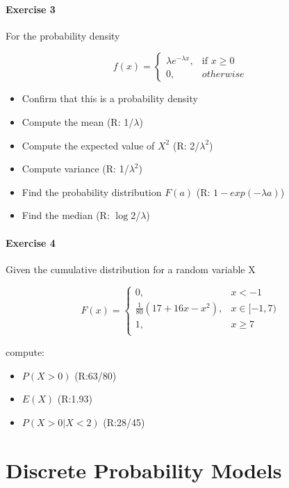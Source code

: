 \documentclass[
]{book}
\providecommand{\tightlist}{%
  \setlength{\itemsep}{0pt}\setlength{\parskip}{0pt}}
\begin{document}
\hypertarget{exercise-3-3}{%
\subsubsection{Exercise 3}\label{exercise-3-3}}

For the probability density

\[
    f(x)= 
\begin{cases}
    \lambda e^{-\lambda x},& \text{if } x \geq 0\\
    0,& otherwise 
\end{cases}
\]

\begin{itemize}
\tightlist
\item
  Confirm that this is a probability density
\item
  Compute the mean (R: 1/\(\lambda\))
\item
  Compute the expected value of \(X^2\) (R: 2/\(\lambda^2\))
\item
  Compute variance (R: 1/\(\lambda^2\))
\item
  Find the probability distribution \(F(a)\) (R: \(1-exp(-\lambda a)\))
\item
  Find the median (R: \(\log{2}\)/\(\lambda\))
\end{itemize}

\hypertarget{exercise-4-2}{%
\subsubsection{Exercise 4}\label{exercise-4-2}}

Given the cumulative distribution for a random variable X

\[
    F(x)= 
\begin{cases}
0, & x  < -1 \\
\frac{1}{80}(17+16x-x^2),& x \in [-1,7)\\
1,& x \geq 7\\
\end{cases}
\]

compute:

\begin{itemize}
\tightlist
\item
  \(P(X>0)\) (R:63/80)
\item
  \(E(X)\) (R:1.93)
\item
  \(P(X>0|X<2)\) (R:28/45)
\end{itemize}

\hypertarget{discrete-probability-models}{%
\chapter{Discrete Probability Models}\label{discrete-probability-models}}
\end{document}
